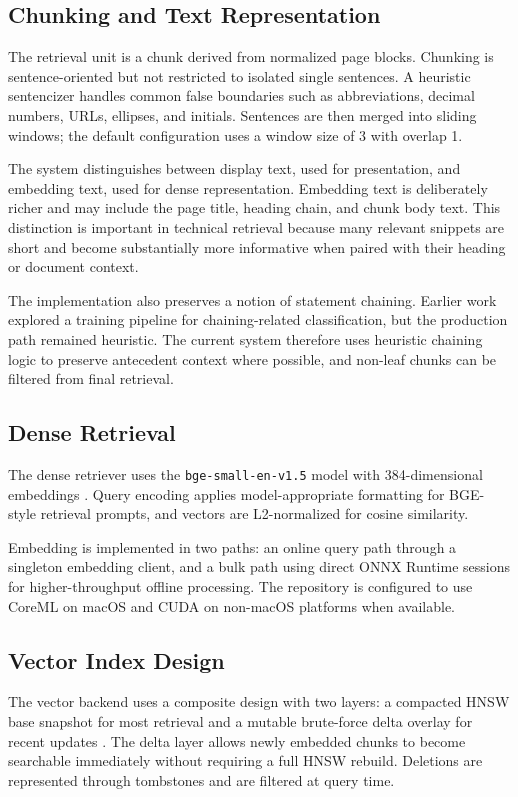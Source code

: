 \documentclass[conference]{IEEEtran}
\begin{document}
\subsection{Chunking and Text Representation}
The retrieval unit is a chunk derived from normalized page blocks. Chunking is sentence-oriented but not restricted to isolated single sentences. A heuristic sentencizer handles common false boundaries such as abbreviations, decimal numbers, URLs, ellipses, and initials. Sentences are then merged into sliding windows; the default configuration uses a window size of 3 with overlap 1.

The system distinguishes between display text, used for presentation, and embedding text, used for dense representation. Embedding text is deliberately richer and may include the page title, heading chain, and chunk body text. This distinction is important in technical retrieval because many relevant snippets are short and become substantially more informative when paired with their heading or document context.

The implementation also preserves a notion of statement chaining. Earlier work explored a training pipeline for chaining-related classification, but the production path remained heuristic. The current system therefore uses heuristic chaining logic to preserve antecedent context where possible, and non-leaf chunks can be filtered from final retrieval.

\subsection{Dense Retrieval}
The dense retriever uses the \texttt{bge-small-en-v1.5} model with 384-dimensional embeddings \cite{bgecard2023,mteb2022}. Query encoding applies model-appropriate formatting for BGE-style retrieval prompts, and vectors are L2-normalized for cosine similarity.

Embedding is implemented in two paths: an online query path through a singleton embedding client, and a bulk path using direct ONNX Runtime sessions for higher-throughput offline processing. The repository is configured to use CoreML on macOS and CUDA on non-macOS platforms when available.

\subsection{Vector Index Design}
The vector backend uses a composite design with two layers: a compacted HNSW base snapshot for most retrieval and a mutable brute-force delta overlay for recent updates \cite{malkov2020hnsw}. The delta layer allows newly embedded chunks to become searchable immediately without requiring a full HNSW rebuild. Deletions are represented through tombstones and are filtered at query time.
\end{document}
